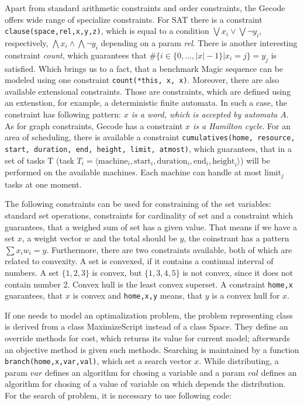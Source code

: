Apart from standard arithmetic constraints and order constraints, the Gecode offers
wide range of specialize constraints. For SAT there is a constraint \texttt{clause(space,rel,x,y,z)},
which is equal to a condition $\bigvee {x_i} \vee \bigvee{\neg y_i}$, respectively, $\bigwedge {x_i} \wedge \bigwedge{\neg y_i}$
depending on a param {\em rel}. There is another interesting constraint {\em count}, which 
guarantees that $\#\{i \in \{0, ..., |x|-1\}|x_i = j\} = y_j$ is satisfied. Which brings us to a fact,
that a benchmark Magic sequence can be modeled using one constraint \texttt{count(*this, x, x)}.
Moreover, there are also available extensional constraints. Those are constraints, which are 
defined using an extenstion, for example, a deterministic finite automata. In such a case, the constraint
has following pattern:  {\em $x$ is a word, which is accepted by automata $A$}. As for graph constraints, 
Gecode has a constraint {\em $x$ is a Hamilton cycle}. For an area of scheduling, there is available
a constraint \texttt{cumulatives(home, resource, start, duration, end, height, limit, atmost)}, which
guarantees, that in a set of tasks T (task $T_i = \langle \mathrm{machine}_i, \mathrm{start}_i,
\mathrm{duration}_i, \mathrm{end}_i, \mathrm{height}_i \rangle$) will be performed on 
the available machines. Each machine can handle at most $\mathrm{limit}_j$ tasks at
one moment.

The following constraints can be used for constraining of the set variables: standard set operations, constraints for cardinality of set and a constraint
which guarantees, that a weighed sum of set has a given value. That means if we have a set $x$, 
a weight vector $w$ and the total should be $y$, the coinstrant has a pattern $\sum{x_i w_i} = y$. 
Furthermore, there are two constraints available, both of which are related to convexity. A set is convexed, 
if it contains a continual interval of numbers. A set $\{1,2,3\}$ is convex, but $\{1,3,4,5\}$ is not 
convex, since it does not contain number 2. Convex hull is the least convex superset. A constraint
\texttt{home,x} guarantees, that $x$ is convex and \texttt{home,x,y} means, that $y$ is a convex hull for $x$.

If one needs to model an optimalization problem, the problem representing class is derived from a class MaximizeScript
instead of a class Space. They define an override methods for cost, which returns its value for current model; 
afterwards an objective method is given such methods. Searching is maintained by
a function \texttt{branch(home,x,var,val)}, which set a search vector $x$. While distributing,
a param $var$ defines an algorithm for chosing a variable and a param $val$ defines an algorithm
for chosing of a value of variable on which depends the distribution. For the search of problem,
it is necessary to use following code: 

